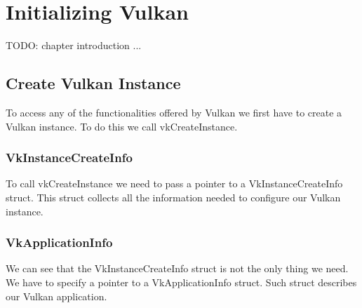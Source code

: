 \chapter{Initializing Vulkan}

TODO: chapter introduction ...

\section{Create Vulkan Instance}

To access any of the functionalities offered by Vulkan we first have to create a Vulkan
instance.
To do this we call vkCreateInstance.

\begin{minipage}{\linewidth}{\noindent}
    
\end{minipage}

\subsection{VkInstanceCreateInfo}

To call vkCreateInstance we need to pass a pointer to a VkInstanceCreateInfo struct.
This struct collects all the information needed to configure our Vulkan instance.

\begin{minipage}{\linewidth}{\noindent}

\end{minipage}

\subsection{VkApplicationInfo}

We can see that the VkInstanceCreateInfo struct is not the only thing we need.
We have to specify a pointer to a VkApplicationInfo struct. Such struct describes
our Vulkan application.

\begin{minipage}{\linewidth}{\noindent}
    
\end{minipage}

